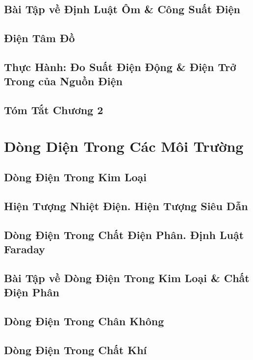 \documentclass[oneside]{book}
\numberwithin{equation}{section}
\begin{document}
\section{Bài Tập về Định Luật Ôm \& Công Suất Điện}

\section{Điện Tâm Đồ}

\section{Thực Hành: Đo Suất Điện Động \& Điện Trở Trong của Nguồn Điện}

\section{Tóm Tắt Chương 2}


\chapter{Dòng Diện Trong Các Môi Trường}

\section{Dòng Điện Trong Kim Loại}

\section{Hiện Tượng Nhiệt Điện. Hiện Tượng Siêu Dẫn}

\section{Dòng Điện Trong Chất Điện Phân. Định Luật Faraday}

\section{Bài Tập về Dòng Điện Trong Kim Loại \& Chất Điện Phân}

\section{Dòng Điện Trong Chân Không}

\section{Dòng Điện Trong Chất Khí}
\end{document}
